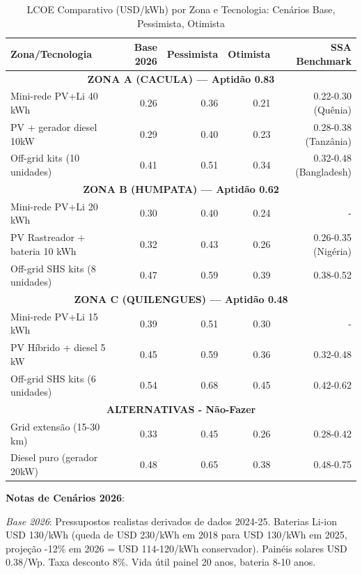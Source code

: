 \documentclass[12pt, a4paper]{article}
\begin{document}
{{{{{{{{{{{\begin{table}[H]
\centering
\caption{LCOE Comparativo (USD/kWh) por Zona e Tecnologia: Cenários Base, Pessimista, Otimista}
\label{tab:lcoe_scenarios}
\small
\begin{tabular}{|l|r|r|r|r|}
\hline
\textbf{Zona/Tecnologia} & \textbf{Base 2026} & \textbf{Pessimista} & \textbf{Otimista} & \textbf{SSA Benchmark} \\
\hline
\multicolumn{5}{|c|}{\textbf{ZONA A (CACULA) --- Aptidão 0.83}} \\
\hline
Mini-rede PV+Li 40 kWh & 0.26 & 0.36 & 0.21 & 0.22-0.30 (Quênia) \\
PV + gerador diesel 10kW & 0.29 & 0.40 & 0.23 & 0.28-0.38 (Tanzânia) \\
Off-grid kits (10 unidades) & 0.41 & 0.51 & 0.34 & 0.32-0.48 (Bangladesh) \\
\hline
\multicolumn{5}{|c|}{\textbf{ZONA B (HUMPATA) --- Aptidão 0.62}} \\
\hline
Mini-rede PV+Li 20 kWh & 0.30 & 0.40 & 0.24 & - \\
PV Rastreador + bateria 10 kWh & 0.32 & 0.43 & 0.26 & 0.26-0.35 (Nigéria) \\
Off-grid SHS kits (8 unidades) & 0.47 & 0.59 & 0.39 & 0.38-0.52 \\
\hline
\multicolumn{5}{|c|}{\textbf{ZONA C (QUILENGUES) --- Aptidão 0.48}} \\
\hline
Mini-rede PV+Li 15 kWh & 0.39 & 0.51 & 0.30 & - \\
PV Híbrido + diesel 5 kW & 0.45 & 0.59 & 0.36 & 0.32-0.48 \\
Off-grid SHS kits (6 unidades) & 0.54 & 0.68 & 0.45 & 0.42-0.62 \\
\hline
\multicolumn{5}{|c|}{\textbf{ALTERNATIVAS - Não-Fazer}} \\
\hline
Grid extensão (15-30 km) & 0.33 & 0.45 & 0.26 & 0.28-0.42 \\
Diesel puro (gerador 20kW) & 0.48 & 0.65 & 0.38 & 0.48-0.75 \\
\hline
\end{tabular}
\end{table}

\textbf{Notas de Cenários 2026}:

\textit{Base 2026}: Pressupostos realistas derivados de dados 2024-25. Baterias Li-ion USD 130/kWh (queda de USD 230/kWh em 2018 para USD 130/kWh em 2025, projeção -12\% em 2026 = USD 114-120/kWh conservador). Painéis solares USD 0.38/Wp. Taxa desconto 8\%. Vida útil painel 20 anos, bateria 8-10 anos.

}}}}}}}}}}}
\end{document}
